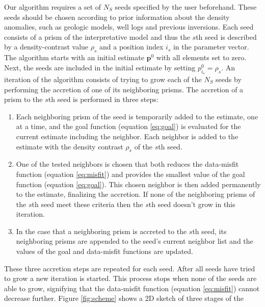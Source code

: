 \documentclass{segabs}
\begin{document}
Our algorithm requires a set of $N_S$ seeds specified by the user beforehand. These
seeds should be chosen according to prior information about the density anomalies,
such as geologic models, well logs and previous inversions. Each seed consists of a
prism of the interpretative model and thus the $s$th seed is described by a density-contrast
value $\rho_s$ and a position index $i_s$ in the parameter vector.
The algorithm starts with an initial estimate $\mathbf{p}^0$ with all elements set
to zero. Next, the seeds are included in the initial estimate by setting
$p^0_{i_s} = \rho_s$. An iteration of the algorithm consists of trying to grow each
of the $N_S$ seeds by performing the accretion of one of its neighboring prisms. The
accretion of a prism to the $s$th seed is performed in three steps:
\begin{enumerate}
  \vspace{-0.25cm}
  \item \begin{sloppypar}Each neighboring prism of the seed is temporarily added to the estimate,
        one at a time, and the goal function (equation \ref{eq:goal}) is
        evaluated for the current
        estimate including the neighbor. Each neighbor is added to the estimate with
        the density contrast $\rho_s$ of the $s$th seed.\end{sloppypar}
  \item One of the tested neighbors is chosen that both reduces the data-misfit function
        (equation \ref{eq:misfit}) and provides the smallest value of the
        goal function (equation \ref{eq:goal}). This chosen
        neighbor is then added permanently to the estimate, finalizing the accretion.
        If none of the neighboring prisms of the $s$th seed meet these criteria then
        the $s$th seed doesn't grow in this iteration.
  \item In the case that a neighboring prism is accreted to the $s$th seed, its neighboring prisms
        are appended to the seed's current neighbor list and the values of the goal and
        data-misfit functions are updated.
  \vspace{-0.25cm}
\end{enumerate}
These three accretion steps are repeated for each seed. After all seeds have tried to
grow a new iteration is started. This process stops when none of the seeds are
able to grow, signifying that the data-misfit function (equation \ref{eq:misfit})
cannot decrease further. Figure \ref{fig:scheme} shows a 2D sketch of three stages of the
\end{document}

